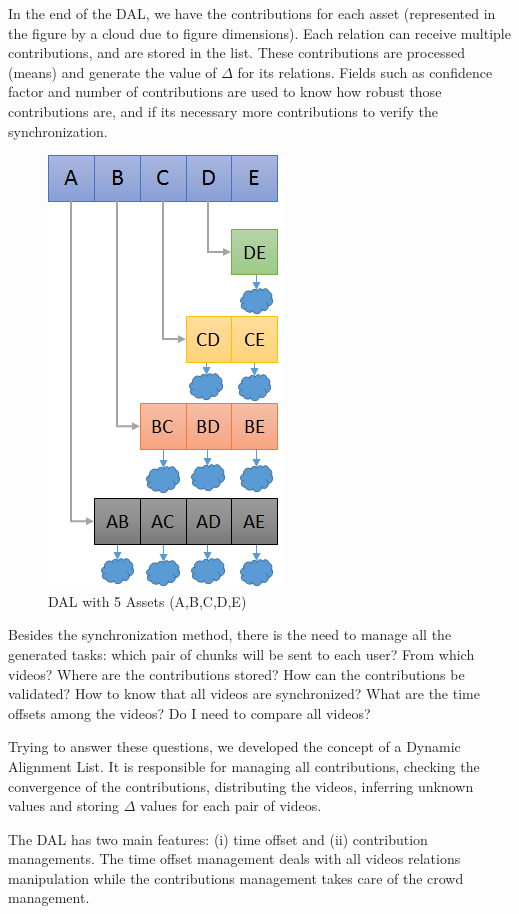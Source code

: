 In the end of the DAL, we have the contributions for each asset (represented in the figure by a cloud due to figure dimensions). Each relation can receive multiple contributions, and are stored in the list. These contributions are processed (means) and generate the value of $\Delta$ for its relations. Fields such as confidence factor and number of contributions are used to know how robust those contributions are, and if its necessary more contributions to verify the synchronization.

\begin{figure}
	\centering
	\includegraphics[scale=0.4]{figure/dal}
	\caption{DAL with 5 Assets (A,B,C,D,E)}
	\label{dal}
\end{figure}


Besides the synchronization method, there is the need to manage all the generated tasks: which pair of chunks will be sent to each user? From which videos? Where are the contributions stored? How can the contributions be validated? How to know that all videos are synchronized? What are the time offsets among the videos? Do I need to compare all videos?

Trying to answer these questions, we developed the concept of a  Dynamic Alignment List. It is responsible for managing all contributions, checking the convergence of the contributions, distributing the videos, inferring unknown values and storing $\Delta$ values for each pair of videos.

The DAL has two main features: (i) time offset and (ii) contribution managements. The time offset management deals with all videos relations manipulation while the contributions management takes care of the crowd management.



